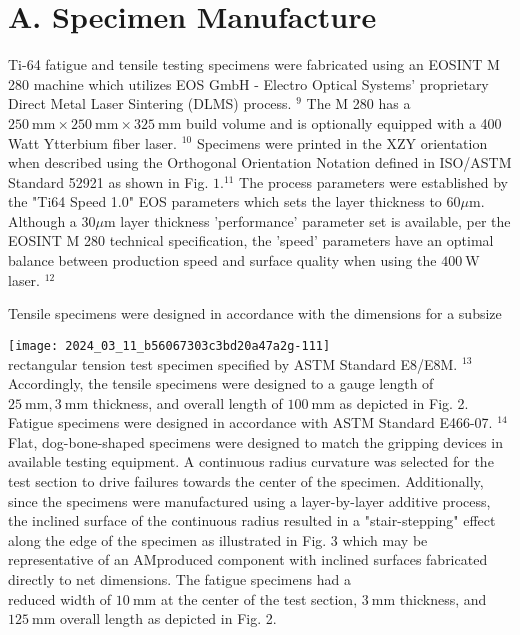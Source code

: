 \documentclass[10pt]{article}
\begin{document}
\section*{A. Specimen Manufacture}
Ti-64 fatigue and tensile testing specimens were fabricated using an EOSINT M 280 machine which utilizes EOS GmbH - Electro Optical Systems' proprietary Direct Metal Laser Sintering (DLMS) process. ${ }^{9}$ The M 280 has a $250 \mathrm{~mm} \times 250 \mathrm{~mm} \times 325 \mathrm{~mm}$ build volume and is optionally equipped with a 400 Watt Ytterbium fiber laser. ${ }^{10}$ Specimens were printed in the XZY orientation when described using the Orthogonal Orientation Notation defined in ISO/ASTM Standard 52921 as shown in Fig. $1 .{ }^{11}$ The process parameters were established by the "Ti64 Speed 1.0" EOS parameters which sets the layer thickness to $60 \mu \mathrm{m}$. Although a $30 \mu \mathrm{m}$ layer thickness 'performance' parameter set is available, per the EOSINT M 280 technical specification, the 'speed' parameters have an optimal balance between production speed and surface quality when using the $400 \mathrm{~W}$ laser. ${ }^{12}$

Tensile specimens were designed in accordance with the dimensions for a subsize

\texttt{[image: 2024\_03\_11\_b56067303c3bd20a47a2g-111]}\\
rectangular tension test specimen specified by ASTM Standard E8/E8M. ${ }^{13}$ Accordingly, the tensile specimens were designed to a gauge length of $25 \mathrm{~mm}, 3 \mathrm{~mm}$ thickness, and overall length of $100 \mathrm{~mm}$ as depicted in Fig. 2. Fatigue specimens were designed in accordance with ASTM Standard E466-07. ${ }^{14}$ Flat, dog-bone-shaped specimens were designed to match the gripping devices in available testing equipment. A continuous radius curvature was selected for the test section to drive failures towards the center of the specimen. Additionally, since the specimens were manufactured using a layer-by-layer additive process, the inclined surface of the continuous radius resulted in a "stair-stepping" effect along the edge of the specimen as illustrated in Fig. 3 which may be representative of an AMproduced component with inclined surfaces fabricated directly to net dimensions. The fatigue specimens had a\\
reduced width of $10 \mathrm{~mm}$ at the center of the test section, $3 \mathrm{~mm}$ thickness, and $125 \mathrm{~mm}$ overall length as depicted in Fig. 2.
\end{document}
